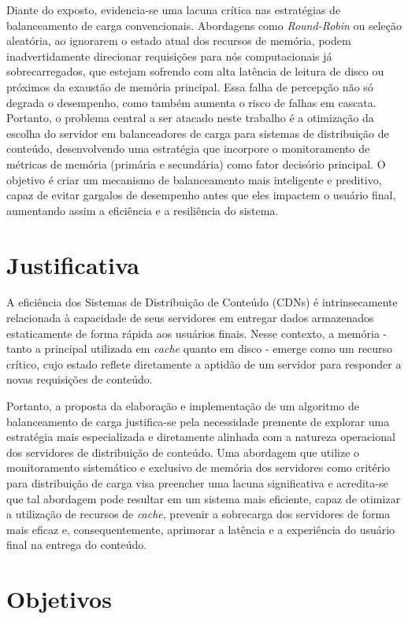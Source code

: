 Diante do exposto, evidencia-se uma lacuna crítica nas estratégias de balanceamento de carga convencionais. Abordagens como \textit{Round-Robin} ou seleção aleatória, ao ignorarem o estado atual dos recursos de memória, podem inadvertidamente direcionar requisições para nós computacionais já sobrecarregados, que estejam sofrendo com alta latência de leitura de disco ou próximos da exaustão de memória principal. Essa falha de percepção não só degrada o desempenho, como também aumenta o risco de falhas em cascata. Portanto, o problema central a ser atacado neste trabalho é a otimização da escolha do servidor em balanceadores de carga para sistemas de distribuição de conteúdo, desenvolvendo uma estratégia que incorpore o monitoramento de métricas de memória (primária e secundária) como fator decisório principal. O objetivo é criar um mecanismo de balanceamento mais inteligente e preditivo, capaz de evitar gargalos de desempenho antes que eles impactem o usuário final, aumentando assim a eficiência e a resiliência do sistema.

\section{Justificativa}

A eficiência dos Sistemas de Distribuição de Conteúdo (CDNs) é intrinsecamente relacionada à capacidade de seus servidores em entregar dados armazenados estaticamente de forma rápida aos usuários finais. Nesse contexto, a memória - tanto a principal utilizada em \textit{cache} quanto em disco - emerge como um recurso crítico, cujo estado reflete diretamente a aptidão de um servidor para responder a novas requisições de conteúdo.

Portanto, a proposta da elaboração e implementação de um algoritmo de balanceamento de carga justifica-se pela necessidade premente de explorar uma estratégia mais especializada e diretamente alinhada com a natureza operacional dos servidores de distribuição de conteúdo. Uma abordagem que utilize o monitoramento sistemático e exclusivo de memória dos servidores como critério para distribuição de carga visa preencher uma lacuna significativa e acredita-se que tal abordagem pode resultar em um sistema mais eficiente, capaz de otimizar a utilização de recursos de \textit{cache}, prevenir a sobrecarga dos servidores de forma mais eficaz e, consequentemente, aprimorar a latência e a experiência do usuário final na entrega do conteúdo.

\section{Objetivos}

